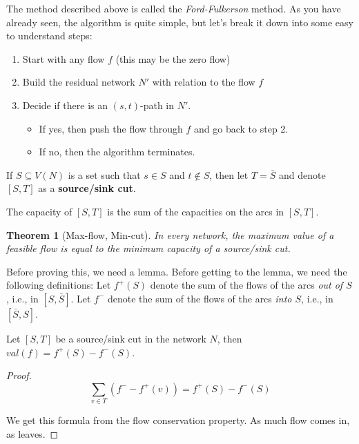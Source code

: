 \documentclass{Book}
\newtheorem{theorem}{Theorem}
\begin{document}
The method described above is called the \textit{Ford-Fulkerson} method. As you have already seen, the algorithm is quite simple, but let's break it down into some easy to understand steps:
\begin{enumerate}
	\item Start with any flow $f$ (this may be the zero flow)
	\item Build the residual network $N'$ with relation to the flow $f$
	\item Decide if there is an $(s,t)$-path in $N'$.
	      \begin{itemize}
		      \item If yes, then push the flow through $f$ and go back to step 2.
		      \item If no, then the algorithm terminates.
	      \end{itemize}
\end{enumerate}


If $S \subseteq V(N)$ is a set such that $s \in S$ and $t \notin S$, then let $T = \bar{S}$ and denote $[S, T]$ as a \textbf{source/sink cut}.

The capacity of $[S, T]$ is the sum of the capacities on the arcs in $[S,T]$.

\begin{theorem}[Max-flow, Min-cut]
	In every network, the maximum value of a feasible flow is equal to the minimum capacity of a source/sink cut.
\end{theorem}

Before proving this, we need a lemma. Before getting to the lemma, we need the following definitions: Let $f^{+}(S)$ denote the sum of the flows of the arcs \textit{out of $S$}, i.e., in $[S, \bar{S}]$. Let $f^{-}$ denote the sum of the flows of the arcs \textit{into $S$}, i.e., in $[\bar{S}, S]$.

\begin{lemma}
	\label{lemma:4.3.7}
	Let $[S, T]$ be a source/sink cut in the network $N$, then $val(f) = f^{+}(S)  - f^{-}(S)$.
\end{lemma}

\begin{proof}
	\begin{equation*}
		\sum_{v \in T} (f^{-} - f^{+}(v)) = f^{+}(S) - f^{-}(S)
	\end{equation*}

	We get this formula from the flow conservation property. As much flow comes in, as leaves.
\end{proof}
\end{document}
